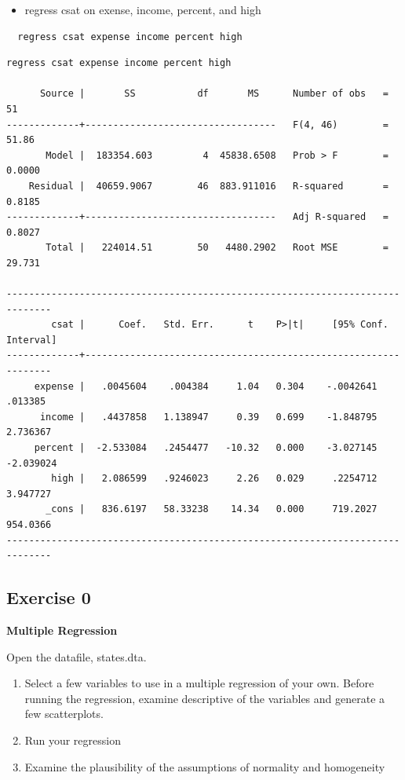 \documentclass[]{book}
\providecommand{\tightlist}{%
  \setlength{\itemsep}{0pt}\setlength{\parskip}{0pt}}
\begin{document}
\begin{itemize}
\tightlist
\item
  regress csat on exense, income, percent, and high
\end{itemize}

\begin{verbatim}
  regress csat expense income percent high
\end{verbatim}

\begin{verbatim}
regress csat expense income percent high

      Source |       SS           df       MS      Number of obs   =        51
-------------+----------------------------------   F(4, 46)        =     51.86
       Model |  183354.603         4  45838.6508   Prob > F        =    0.0000
    Residual |  40659.9067        46  883.911016   R-squared       =    0.8185
-------------+----------------------------------   Adj R-squared   =    0.8027
       Total |   224014.51        50   4480.2902   Root MSE        =    29.731

------------------------------------------------------------------------------
        csat |      Coef.   Std. Err.      t    P>|t|     [95% Conf. Interval]
-------------+----------------------------------------------------------------
     expense |   .0045604    .004384     1.04   0.304    -.0042641     .013385
      income |   .4437858   1.138947     0.39   0.699    -1.848795    2.736367
     percent |  -2.533084   .2454477   -10.32   0.000    -3.027145   -2.039024
        high |   2.086599   .9246023     2.26   0.029     .2254712    3.947727
       _cons |   836.6197   58.33238    14.34   0.000     719.2027    954.0366
------------------------------------------------------------------------------
\end{verbatim}

\subsection{Exercise 0}\label{exercise-0-7}

\textbf{Multiple Regression}

Open the datafile, states.dta.

\begin{enumerate}
\def\labelenumi{\arabic{enumi}.}
\tightlist
\item
  Select a few variables to use in a multiple regression of your own.
  Before running the regression, examine descriptive of the variables
  and generate a few scatterplots.
\item
  Run your regression
\item
  Examine the plausibility of the assumptions of normality and
  homogeneity
\end{enumerate}
\end{document}
